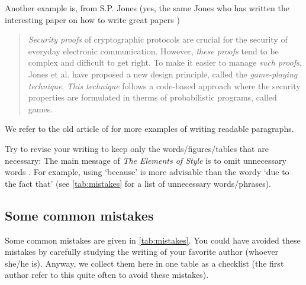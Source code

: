 \documentclass[authoryear,12pta4paper,fleqn]{article}
\numberwithin{equation}{section}
\theoremstyle{remark}
\begin{document}
Another example is, from S.P. Jones (yes, the same Jones who has written the interesting paper on how to write great papers \citep{Jones})
\begin{quote}
\textit{Security proofs} of cryptographic protocols are crucial for the security of everyday electronic communication. However, \textit{these proofs} tend to be complex and difficult to get right. To make it easier to manage \textit{such proofs}, Jones et al. have proposed a new design principle, called the \textit{game-playing technique}. 
\textit{This technique} follows a code-based approach where the security properties are formulated in therms of probabilistic programs, called games.
\end{quote} 
We refer to the old article of \cite{gopen1990science} for more examples of writing readable paragraphs.

Try to revise your writing to keep only the words/figures/tables that are necessary: The main message of \textit{The Elements of Style} is to omit unnecessary words \citep{white1972elements}. For example, using `because' is more advisable than the wordy `due to the fact that' (see \cref{tab:mistakes} for a list of unnecessary words/phrases).\\





% 
\subsection{Some common mistakes}\label{sec:mistakes}


Some common mistakes are given in \cref{tab:mistakes}. You could have avoided these mistakes by carefully studying the writing of your favorite author (whoever she/he is). Anyway, we collect them here in one table as a checklist (the first author refer to this quite often to avoid these mistakes).
\end{document}
